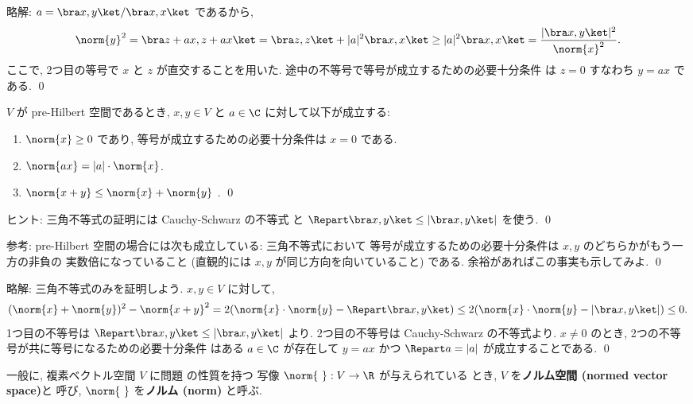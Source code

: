 \documentclass[12pt,twoside]{jarticle}
\newcommand\commentout[1]{#1}
\newcommand\commentout[1]{}
\begin{document}
\commentout{
\medskip
\noindent
略解: $a = \bra x,y\ket/\bra x,x\ket$ であるから, 
\begin{equation*}
  \norm{y}^2
  = \bra z+ax, z+ax \ket
  = \bra z, z\ket + |a|^2 \bra x, x\ket
  \ge |a|^2 \bra x, x\ket
  = \frac{|\bra x,y\ket|^2}{\norm{x}^2}.
\end{equation*}
ここで, 2つ目の等号で $x$ と $z$ が直交することを用いた.
途中の不等号で等号が成立するための必要十分条件
は $z=0$ すなわち $y=ax$ である.
\qed
}


\begin{question}[ノルムの基本性質, 10点]
\label{q:norm-axioms}
  $V$ が pre-Hilbert 空間であるとき, 
  $x,y\in V$ と $a\in\C$ に対して以下が成立する:
  \begin{enumerate}
  \item $\norm{x}\ge 0$ であり, 
    等号が成立するための必要十分条件は $x=0$ である.
  \item $\norm{ax}=|a|\cdot\norm{x}$.
  \item $\norm{x+y}\le\norm{x}+\norm{y}$
    . 
    \qed
  \end{enumerate}
\end{question}

\noindent 
ヒント: 三角不等式の証明には Cauchy-Schwarz の不等式
と $\Repart\bra x,y\ket\le|\bra x,y\ket|$ を使う.
\qed

\medskip
\noindent
参考: pre-Hilbert 空間の場合には次も成立している: 三角不等式において
等号が成立するための必要十分条件は $x,y$ のどちらかがもう一方の非負の
実数倍になっていること (直観的には $x,y$ が同じ方向を向いていること) である.
余裕があればこの事実も示してみよ.
\qed

\commentout{
\medskip
\noindent
略解: 三角不等式のみを証明しよう. $x,y\in V$ に対して,
\begin{equation*}
  (\norm{x}+\norm{y})^2 - \norm{x+y}^2
  = 2(\norm{x}\cdot\norm{y} - \Repart\bra x,y\ket)
  \le 2(\norm{x}\cdot\norm{y} - |\bra x,y\ket|)
  \le 0.
\end{equation*}
1つ目の不等号は $\Repart\bra x,y\ket\le|\bra x,y\ket|$ より.
2つ目の不等号は Cauchy-Schwarz の不等式より.
$x\ne 0$ のとき, 2つの不等号が共に等号になるための必要十分条件
はある $a\in\C$ が存在して $y=ax$ 
かつ $\Repart a = |a|$ が成立することである.
\qed
}

\medskip

一般に, 複素ベクトル空間 $V$ に問題  の性質を持つ
写像 $\norm{{\ }}:V\to\R$ が与えられている
とき, $V$ を{\bf ノルム空間 (normed vector space)}と
呼び, $\norm{{\ }}$ を{\bf ノルム (norm)} と呼ぶ.
\end{document}
